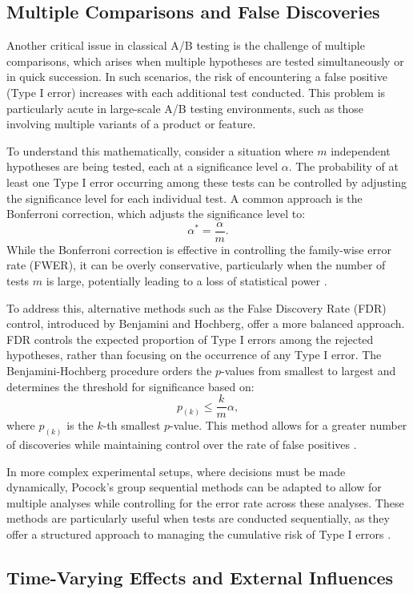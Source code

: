 \documentclass[magisterska, english]{pwr_wmat_praca_dyplomowa}
\theoremstyle{plain}
\numberwithin{theorem}{chapter}
\theoremstyle{definition}
\numberwithin{theorem}{chapter}
\begin{document}
\subsection{Multiple Comparisons and False Discoveries}

Another critical issue in classical A/B testing is the challenge of multiple comparisons, which arises when multiple hypotheses are tested simultaneously or in quick succession. In such scenarios, the risk of encountering a false positive (Type I error) increases with each additional test conducted. This problem is particularly acute in large-scale A/B testing environments, such as those involving multiple variants of a product or feature.

To understand this mathematically, consider a situation where $m$ independent hypotheses are being tested, each at a significance level $\alpha$. The probability of at least one Type I error occurring among these tests can be controlled by adjusting the significance level for each individual test. A common approach is the Bonferroni correction, which adjusts the significance level to:
\[
\alpha^* = \frac{\alpha}{m}.
\]
While the Bonferroni correction is effective in controlling the family-wise error rate (FWER), it can be overly conservative, particularly when the number of tests $m$ is large, potentially leading to a loss of statistical power \cite{Holm1979}.

To address this, alternative methods such as the False Discovery Rate (FDR) control, introduced by Benjamini and Hochberg, offer a more balanced approach. FDR controls the expected proportion of Type I errors among the rejected hypotheses, rather than focusing on the occurrence of any Type I error. The Benjamini-Hochberg procedure orders the $p$-values from smallest to largest and determines the threshold for significance based on:
\[
p_{(k)} \leq \frac{k}{m} \alpha,
\]
where $p_{(k)}$ is the $k$-th smallest $p$-value. This method allows for a greater number of discoveries while maintaining control over the rate of false positives \cite{Benjamini1995}.

In more complex experimental setups, where decisions must be made dynamically, Pocock's group sequential methods can be adapted to allow for multiple analyses while controlling for the error rate across these analyses. These methods are particularly useful when tests are conducted sequentially, as they offer a structured approach to managing the cumulative risk of Type I errors \cite{Pocock1977}.

\subsection{Time-Varying Effects and External Influences}
\end{document}
